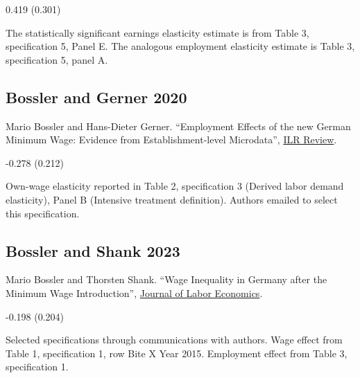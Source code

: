  0.419 (0.301)

\vspace{0.7em}

 The statistically significant earnings elasticity estimate is from Table 3, specification 5, Panel E. The analogous employment elasticity estimate is Table 3, specification 5, panel A.

\subsection*{Bossler and Gerner 2020}
\vspace{-0.7em}

\noindent Mario Bossler and Hans-Dieter Gerner. ``Employment Effects of the new German Minimum Wage: Evidence from Establishment-level Microdata'', \href{https://doi.org/10.1177/0019793919889635}{ILR Review}.

\vspace{0.7em}

 -0.278 (0.212)

\vspace{0.7em}

 Own-wage elasticity reported in Table 2, specification 3 (Derived labor demand elasticity), Panel B (Intensive treatment definition). Authors emailed to select this specification.

\subsection*{Bossler and Shank 2023}
\vspace{-0.7em}

\noindent Mario Bossler and Thorsten Shank. ``Wage Inequality in Germany after the Minimum Wage Introduction'', \href{https://doi.org/10.1086/720391}{Journal of Labor Economics}.

\vspace{0.7em}

 -0.198 (0.204)

\vspace{0.7em}

 Selected specifications through communications with authors. Wage effect from Table 1, specification 1, row Bite X Year 2015. Employment effect from Table 3, specification 1.

